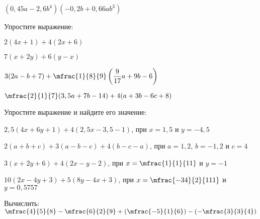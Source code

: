 \begin{class}[number=5]
\begin{listofex}
\begin{enumcols}[itemcolumns=2]
			\item \( (0,45a-2,6b^4)(-0,2b+0,66ab^3) \)
		\end{enumcols}
		\item Упростите выражение:
		\begin{enumcols}[itemcolumns=2]
			\item \( 2(4x+1)+4(2x+6) \)
			\item \( 7(x+2y)+6(y-x) \)
			\item \( 3(2a-b+7)+\mfrac{1}{8}{9}\left( \dfrac{9}{17}a+9b-6 \right) \)
			\item \( \mfrac{2}{1}{7}(3,5a+7b-14)+4(a+3b-6c+8) \)
		\end{enumcols}
		\item Упростите выражение и найдите его значение:
				\begin{enumcols}
				\item \( 2,5(4x+6y+1)+4(2,5x-3,5-1) \), при \( x=1,5 \) и \( y=-4,5 \)
				\item \( 2(a+b+c)+3(a-b-c)+4(b-c-a) \), при \( a=1,2 \), \( b=-1,2 \) и \( c=4 \)
				\item \( 3(x+2y+6)+4(2x-y-2) \), при \( x=\mfrac{1}{1}{11} \) и \( y=-1 \)
				\item \( 10(2x-4y+3)+5(8y-4x+3) \), при \( x=\mfrac{-34}{2}{111} \) и \( y=0,5757 \)
			\end{enumcols}
		\item Вычислить:  \quad
		\( \mfrac{4}{5}{8}-\mfrac{6}{2}{9}+\left( \mfrac{-5}{1}{6} \right)-\left( -\mfrac{3}{3}{4} \right) \)
		\end{listofex}
\end{class}
%
%
%	
%
%
%
%	
%
%
%	
%
%
%	
